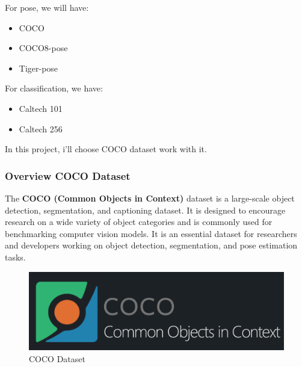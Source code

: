         For pose, we will have:
        \begin{itemize}
            \item COCO
            \item COCO8-pose
            \item Tiger-pose
        \end{itemize}
        For classification, we have:
        \begin{itemize}
            \item Caltech 101 
            \item Caltech 256
        \end{itemize}
        In this project, i'll choose COCO dataset work with it.
        \subsubsection{Overview COCO Dataset}
            The \textbf{COCO (Common Objects in Context)} dataset is a large-scale object detection, segmentation, and captioning dataset. It is designed to encourage research on a wide variety of object categories and is commonly used for benchmarking computer vision models. It is an essential dataset for researchers and developers working on object detection, segmentation, and pose estimation tasks.
            \begin{figure}[H]
                \centering
                \includegraphics[width=0.8\linewidth]{img/coco-logo.png}
                \caption{COCO Dataset}
                \label{fig:coco}
            \end{figure}
